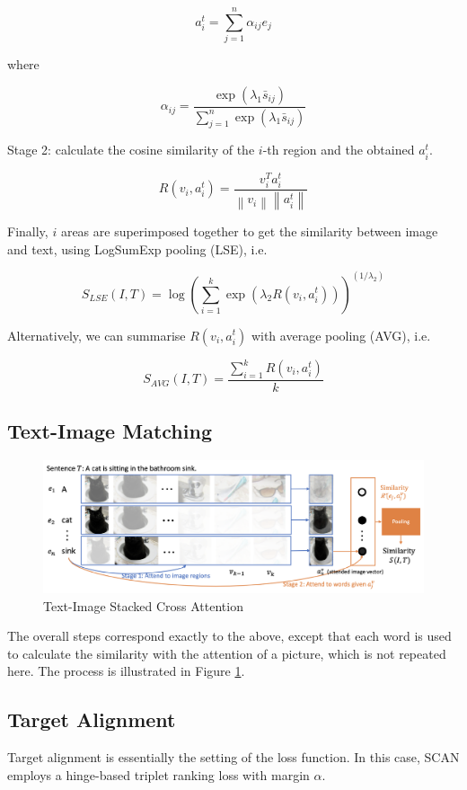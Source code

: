 $$
a_{i}^{t}=\sum_{j=1}^{n} \alpha_{i j} e_{j}
$$

where

$$
\alpha_{i j}=\frac{\exp \left(\lambda_{1} \bar{s}_{i j}\right)}{\sum_{j=1}^{n} \exp \left(\lambda_{1} \bar{s}_{i j}\right)}
$$

Stage 2: calculate the cosine similarity of the $i$-th region and the obtained $a_{i}^{t}$.

$$
R\left(v_{i}, a_{i}^{t}\right)=\frac{v_{i}^{T} a_{i}^{t}}{\left\|v_{i}\right\|\left\|a_{i}^{t}\right\|}
$$

Finally, $i$ areas are superimposed together to get the similarity between image and text, using LogSumExp pooling (LSE), i.e.

$$
S_{L S E}(I, T)=\log \left(\sum_{i=1}^{k} \exp \left(\lambda_{2} R\left(v_{i}, a_{i}^{t}\right)\right)\right)^{\left(1 / \lambda_{2}\right)}
$$

Alternatively, we can
summarise $R\left(v_{i}, a_{i}^{t}\right)$ with average pooling (AVG), i.e.

$$
S_{A V G}(I, T)=\frac{\sum_{i=1}^{k} R\left(v_{i}, a_{i}^{t}\right)}{k}
$$

\subsection{Text-Image Matching}

\begin{figure}[h!]
\centering
\includegraphics[width=1\textwidth]{scan2.pdf}
\caption{Text-Image Stacked Cross Attention \cite{scan}}
\label{fig:scan2}
\end{figure}

The overall steps correspond exactly to the above, except that each word is used to calculate the similarity with the attention of a picture, which is not repeated here. The process is illustrated in Figure \ref{fig:scan2}.

\subsection{Target Alignment}
Target alignment is essentially the setting of the loss function. In this case, SCAN employs a hinge-based triplet ranking loss with margin $\alpha$.

